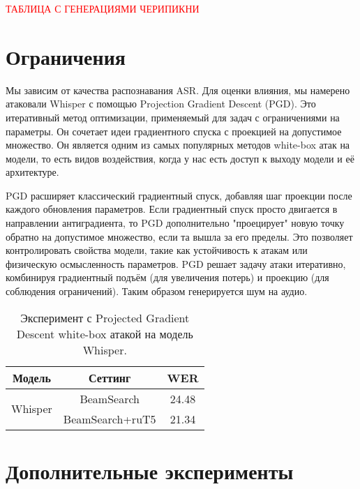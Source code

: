 \textcolor{red}{ТАБЛИЦА С ГЕНЕРАЦИЯМИ ЧЕРИПИКНИ}

\section{Ограничения}

Мы зависим от качества распознавания ASR.
Для оценки влияния, мы намерено атаковали Whisper с помощью Projection Gradient Descent (PGD).
Это итеративный метод оптимизации, применяемый для задач с ограничениями на параметры.
Он сочетает идеи градиентного спуска с проекцией на допустимое множество.
Он является одним из самых популярных методов white-box атак на модели, то есть видов воздействия, когда у нас есть доступ к выходу модели и её архитектуре.

PGD расширяет классический градиентный спуск, добавляя шаг проекции после каждого обновления параметров.
Если градиентный спуск просто двигается в направлении антиградиента, то PGD дополнительно "проецирует" новую точку обратно на допустимое множество, если та вышла за его пределы. Это позволяет контролировать свойства модели, такие как устойчивость к атакам или физическую осмысленность параметров.
PGD решает задачу атаки итеративно, комбинируя градиентный подъём (для увеличения потерь) и проекцию (для соблюдения ограничений).
Таким образом генерируется шум на аудио.

\begin{table}[]
\centering
\caption{Эксперимент с Projected Gradient Descent white-box атакой на модель Whisper.}
\begin{tabular}{|c|c|c|}
\hline
Модель                         & Сеттинг                              & WER     \\ \hline
\multirow{2}{*}{Whisper}       & BeamSearch                           & 24.48   \\ \cline{2-3} 
                               & BeamSearch+ruT5                      & 21.34   \\ \hline
\end{tabular}
\label{tab:pgd}
\end{table}

\section{Дополнительные эксперименты}

